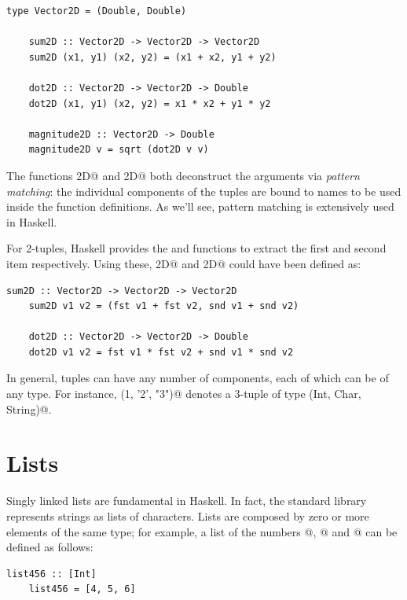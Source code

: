 \documentclass[UdineBachThesis,american,11pt]{PhdThesis}
\begin{document}
  \begin{lstlisting}[gobble=4,basicstyle=\ttfamily\small]
    type Vector2D = (Double, Double)

    sum2D :: Vector2D -> Vector2D -> Vector2D
    sum2D (x1, y1) (x2, y2) = (x1 + x2, y1 + y2)

    dot2D :: Vector2D -> Vector2D -> Double
    dot2D (x1, y1) (x2, y2) = x1 * x2 + y1 * y2

    magnitude2D :: Vector2D -> Double
    magnitude2D v = sqrt (dot2D v v)
  \end{lstlisting}

  The functions \lstinline@sum2D@ and \lstinline@dot2D@ both deconstruct the
  arguments via \emph{pattern matching}: the individual components of the tuples
  are bound to names to be used inside the function definitions. As we'll see,
  pattern matching is extensively used in Haskell.

  For 2-tuples, Haskell provides the \lstinline@fst@ and \lstinline@snd@
  functions to extract the first and second item respectively. Using these,
  \lstinline@sum2D@ and \lstinline@dot2D@ could have been defined as:

  \begin{lstlisting}[gobble=4,basicstyle=\ttfamily\small]
    sum2D :: Vector2D -> Vector2D -> Vector2D
    sum2D v1 v2 = (fst v1 + fst v2, snd v1 + snd v2)

    dot2D :: Vector2D -> Vector2D -> Double
    dot2D v1 v2 = fst v1 * fst v2 + snd v1 * snd v2
  \end{lstlisting}

  In general, tuples can have any number of components, each of which can be of
  any type. For instance, \lstinline@(1, '2', "3")@ denotes a 3-tuple of type
  \lstinline@(Int, Char, String)@.

  \section{Lists}

  Singly linked lists are fundamental in Haskell. In fact, the standard library
  represents strings as lists of characters. Lists are composed by zero or more
  elements of the same type; for example, a list of the numbers @,
  @ and @ can be defined as follows:

  \begin{lstlisting}[gobble=4,basicstyle=\ttfamily\small]
    list456 :: [Int]
    list456 = [4, 5, 6]
  \end{lstlisting}
\end{document}
